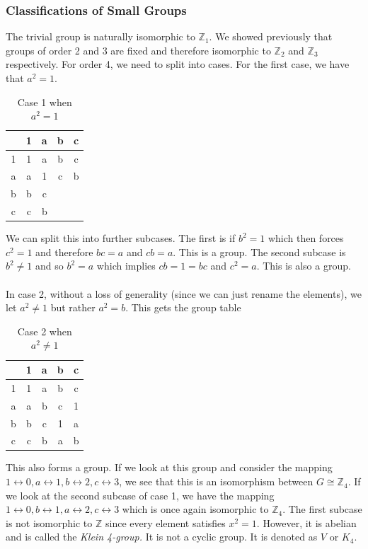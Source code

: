 \documentclass{article}
\newcommand{\Z}{\mathbb{Z}}
\theoremstyle{definition}
\begin{document}
\subsubsection{Classifications of Small Groups}
The trivial group is naturally isomorphic to $\Z_1$. We showed previously that groups of order 2 and 3 are fixed and therefore isomorphic to $\Z_2$ and $\Z_3$ respectively. For order 4, we need to split into cases. For the first case, we have that $a^2=1$.
\begin{table}[htbp]
    \centering
    \begin{tabular}{c|c|c|c|c}
         &  1&a&b&c  \\ \hline
         1&1&a&b&c \\ \hline 
         a&a&1&c&b \\ \hline
         b&b&c&&\\ \hline
         c&c&b&&
    \end{tabular}
    \caption{Case 1 when $a^2=1$}
    \label{tab:case1}
\end{table}
We can split this into further subcases. The first is if $b^2=1$ which then forces $c^2=1$ and therefore $bc=a$ and $cb=a$. This is a group. The second subcase is $b^2\neq 1$ and so $b^2=a$ which implies $cb=1=bc$ and $c^2=a$. This is also a group. \\\\
In case 2, without a loss of generality (since we can just rename the elements), we let $a^2\neq 1$ but rather $a^2 =b$. This gets the group table 
\begin{table}[htbp]
    \centering
    \begin{tabular}{c|c|c|c|c}
         &  1&a&b&c  \\ \hline
         1&1&a&b&c \\ \hline 
         a&a&b&c&1 \\ \hline
         b&b&c&1&a\\ \hline
         c&c&b&a&b
    \end{tabular}
    \caption{Case 2 when $a^2\neq 1$}
    \label{tab:case2}
\end{table}
This also forms a group. If we look at this group and consider the mapping $1\leftrightarrow 0, a\leftrightarrow 1, b\leftrightarrow 2, c\leftrightarrow 3$, we see that this is an isomorphism between $G \cong \Z_4$. If we look at the second subcase of case 1, we have the mapping $1\leftrightarrow 0, b\leftrightarrow 1, a\leftrightarrow 2, c\leftrightarrow 3$ which is once again isomorphic to $\Z_4$. The first subcase is not isomorphic to $\Z$ since every element satisfies $x^2=1$. However, it is abelian and is called the \emph{Klein 4-group.} It is not a cyclic group. It is denoted as $V$ or $K_4$.
\end{document}
